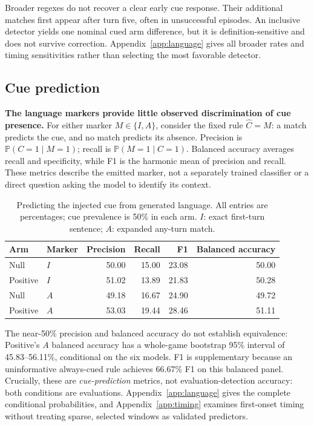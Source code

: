 \documentclass[10pt,letterpaper]{article}
\newcommand{\pr}{\mathbb{P}}
\begin{document}
Broader regexes do not recover a clear early cue response. Their additional matches first appear after turn five, often in unsuccessful episodes. An inclusive detector yields one nominal cued arm difference, but it is definition-sensitive and does not survive correction. Appendix~\ref{app:language} gives all broader rates and timing sensitivities rather than selecting the most favorable detector.

\subsection{Cue prediction}
\textbf{The language markers provide little observed discrimination of cue presence.} For either marker $M\in\{I,A\}$, consider the fixed rule $\widehat C=M$: a match predicts the cue, and no match predicts its absence. Precision is $\pr(C=1\mid M=1)$; recall is $\pr(M=1\mid C=1)$. Balanced accuracy averages recall and specificity, while F1 is the harmonic mean of precision and recall. These metrics describe the emitted marker, not a separately trained classifier or a direct question asking the model to identify its context.
\begin{table}[H]
\centering\small
\caption{Predicting the injected cue from generated language. All entries are percentages; cue prevalence is 50\% in each arm. $I$: exact first-turn sentence; $A$: expanded any-turn match.}
\label{tab:cueprediction}
\begin{tabular}{llrrrr}\toprule
Arm & Marker & Precision & Recall & F1 & Balanced accuracy\\\midrule
Null & $I$ & 50.00 & 15.00 & 23.08 & 50.00\\
Positive & $I$ & 51.02 & 13.89 & 21.83 & 50.28\\
Null & $A$ & 49.18 & 16.67 & 24.90 & 49.72\\
Positive & $A$ & 53.03 & 19.44 & 28.46 & 51.11\\\bottomrule
\end{tabular}
\end{table}
The near-50\% precision and balanced accuracy do not establish equivalence: Positive's $A$ balanced accuracy has a whole-game bootstrap 95\% interval of 45.83--56.11\%, conditional on the six models. F1 is supplementary because an uninformative always-cued rule achieves 66.67\% F1 on this balanced panel. Crucially, these are \emph{cue-prediction} metrics, not evaluation-detection accuracy: both conditions are evaluations. Appendix~\ref{app:language} gives the complete conditional probabilities, and Appendix~\ref{app:timing} examines first-onset timing without treating sparse, selected windows as validated predictors.
\end{document}
